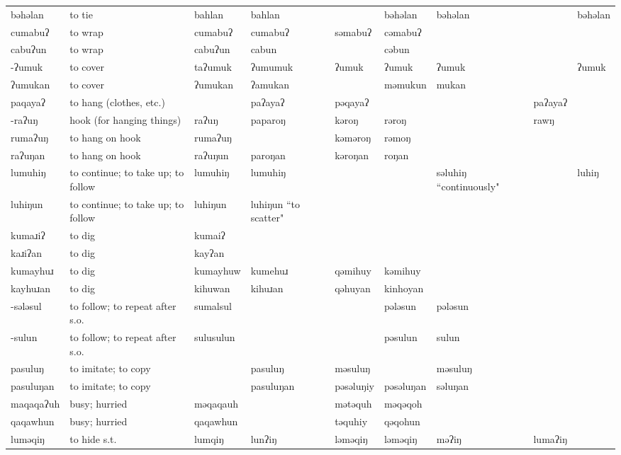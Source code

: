 \begin{landscape}
\begin{longtable}{*{9}{p{}}}
\text{*}bəhəlan & to tie & bahlan & bahlan &  & bəhəlan & bəhəlan &  & bəhəlan\\
\text{*}cumabuʔ & to wrap & cumabuʔ & cumabuʔ & səmabuʔ & cəmabuʔ &  &  & \\
\text{*}cabuʔun & to wrap & cabuʔun & cabun &  & cəbun &  &  & \\
\text{*}-ʔumuk & to cover & taʔumuk & ʔumumuk & ʔumuk & ʔumuk & ʔumuk &  & ʔumuk\\
\text{*}ʔumukan & to cover & ʔumukan & ʔamukan &  & məmukun & mukan &  & \\
\text{*}paqayaʔ & to hang (clothes, etc.) &  & paʔayaʔ & pəqayaʔ &  &  & paʔayaʔ & \\
\text{*}-raʔuŋ & hook (for hanging things) & raʔuŋ & paparoŋ & kəroŋ & rəroŋ &  & rawŋ & \\
\text{*}rumaʔuŋ & to hang on hook & rumaʔuŋ &  & kəməroŋ & rəmoŋ &  &  & \\
\text{*}raʔuŋan & to hang on hook & raʔuŋun & paroŋan & kəroŋan & roŋan &  &  & \\
\text{*}lumuhiŋ & to continue; to take up; to follow & lumuhiŋ & lumuhiŋ &  &  & səluhiŋ ``continuously" &  & luhiŋ\\
\text{*}luhiŋun & to continue; to take up; to follow & luhiŋun & luhiŋun ``to scatter" &  &  &  &  & \\
\text{*}kumaɹiʔ & to dig & kumaiʔ &  &  &  &  &  & \\
\text{*}kaɹiʔan & to dig & kayʔan &  &  &  &  &  & \\
\text{*}kumayhuɹ & to dig & kumayhuw & kumehuɹ & qəmihuy & kəmihuy &  &  & \\
\text{*}kayhuɹan & to dig & kihuwan & kihuɹan & qəhuyan & kinhoyan &  &  & \\
\text{*}-sələsul & to follow; to repeat after s.o. & sumalsul &  &  & pələsun & pələsun &  & \\
\text{*}-sulun & to follow; to repeat after s.o. & sulusulun &  &  & pəsulun & sulun &  & \\
\text{*}pasuluŋ & to imitate; to copy &  & pasuluŋ & məsuluŋ &  & məsuluŋ &  & \\
\text{*}pasuluŋan & to imitate; to copy &  & pasuluŋan & pəsəluŋiy & pəsəluŋan & səluŋan &  & \\
\text{*}maqaqaʔuh & busy; hurried & məqaqauh &  & mətəquh & məqəqoh &  &  & \\
\text{*}qaqawhun & busy; hurried & qaqawhun &  & təquhiy & qəqohun &  &  & \\
\text{*}luməqiŋ & to hide s.t. & lumqiŋ & lunʔiŋ & ləməqiŋ & ləməqiŋ & məʔiŋ & lumaʔiŋ & \\

\end{longtable}
\end{landscape}
